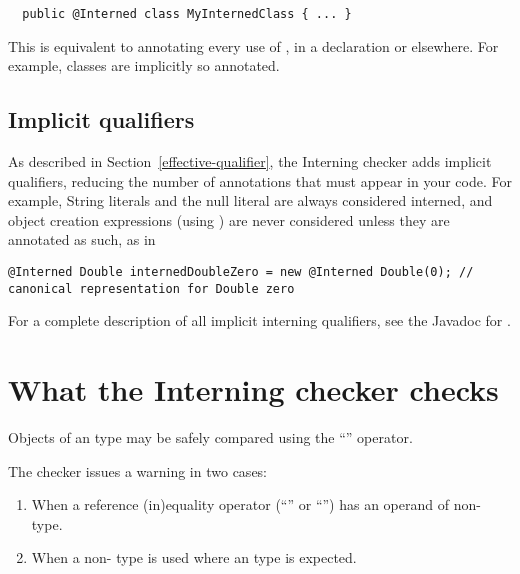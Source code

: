 \begin{Verbatim}
  public @Interned class MyInternedClass { ... }
\end{Verbatim}

This is equivalent to annotating every use of , in a
declaration or elsewhere.  For example,  classes are implicitly
so annotated.


\subsection{Implicit qualifiers\label{interning-implicit-qualifiers}}

As described in Section~\ref{effective-qualifier}, the Interning checker
adds implicit qualifiers, reducing the number of annotations that must
appear in your code.
For example, String literals and the null literal are always considered interned, and
object creation expressions (using ) are never considered
 unless they are annotated as such, as in

\begin{smaller}
\begin{Verbatim}
@Interned Double internedDoubleZero = new @Interned Double(0); // canonical representation for Double zero
\end{Verbatim}
\end{smaller}

For a complete description of all implicit interning qualifiers, see the
Javadoc for .


\section{What the Interning checker checks\label{interning-checks}}

Objects of an  type may be safely compared using the ``\code{==}''
operator.

The checker issues a warning in two cases:

\begin{enumerate}

\item
  When a reference (in)equality operator (``\code{==}'' or ``\code{!=}'')
  has an operand of non- type.

\item
  When a non- type is used where an  type
  is expected.

\end{enumerate}

